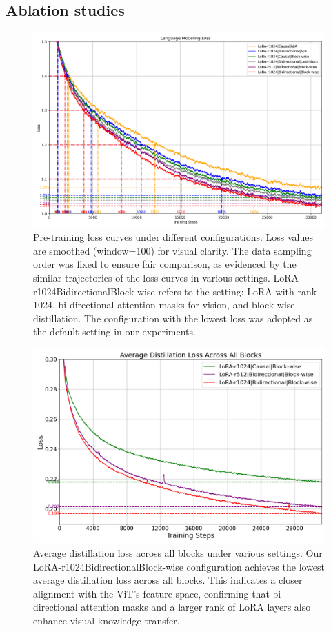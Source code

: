 \subsection{Ablation studies}
\begin{figure}
    \centering
    \includegraphics[width=\linewidth]{images/ablation_loss.png}
    \caption{Pre-training loss curves under different configurations. Loss values are smoothed (window=100) for visual clarity. The data sampling order was fixed to ensure fair comparison, as evidenced by the similar trajectories of the loss curves in various settings. LoRA-r1024\textbar Bidirectional\textbar Block-wise refers to the setting: LoRA with rank 1024, bi-directional attention masks for vision, and block-wise distillation. The configuration with the lowest loss was adopted as the default setting in our experiments.}
    \label{fig:ablation_loss}
\end{figure}
\begin{figure}
    \centering
    \includegraphics[width=\linewidth]{images/aux_loss_ablation.png}
    \caption{Average distillation loss across all blocks under various settings. Our LoRA-r1024\textbar Bidirectional\textbar Block-wise configuration achieves the lowest average distillation loss across all blocks. This indicates a closer alignment with the ViT’s feature space, confirming that bi-directional attention masks and a larger rank of LoRA layers also enhance visual knowledge transfer.}
    \label{fig:aux_loss}
\end{figure}
